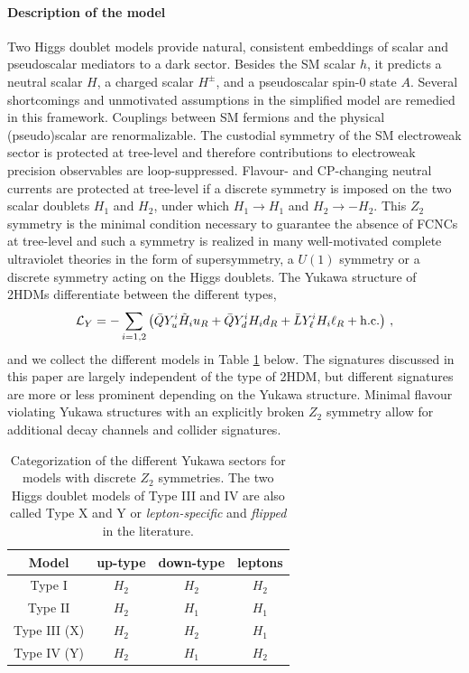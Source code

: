 




\paragraph{Description of the model}
Two Higgs doublet models provide natural, consistent embeddings of scalar and pseudoscalar mediators to a dark sector. Besides the SM scalar $h$, it predicts a neutral scalar $H$, a charged scalar $H^\pm$, and a pseudoscalar spin-0 state $A$. Several shortcomings and unmotivated assumptions in the simplified model are remedied in this framework. Couplings between SM fermions and the physical (pseudo)scalar are renormalizable. The custodial symmetry of the SM electroweak sector is protected at tree-level and therefore contributions to electroweak precision observables are loop-suppressed. Flavour- and CP-changing neutral currents are protected at tree-level if a discrete symmetry is imposed on the two scalar doublets $H_1$ and $H_2$, under which $H_1\to H_1$ and $H_2\to -H_2$. This $Z_2$ symmetry is the minimal condition necessary to guarantee the absence of FCNCs at tree-level \cite{Glashow:1976nt,Paschos:1976ay} and such a symmetry is realized in many well-motivated complete ultraviolet theories in the form of supersymmetry, a $U(1)$ symmetry or a discrete symmetry acting on the Higgs doublets. The Yukawa structure of 2HDMs differentiate between the different types, 
\begin{equation} \label{eq:LY}
{\cal L}_{Y} = - \sum_{i=1,2} \left ( \bar Q Y_u^i \tilde H_i u_R  + \bar Q Y_d^i H_i d_R   + \bar L Y_\ell^i H_i \ell_R  + {\rm h.c.}  \right ) \,,
\end{equation}
and we collect the different models in Table \ref{tab:coeffs} below. The signatures discussed in this paper are largely independent of the type of 2HDM, but different signatures are more or less prominent depending on the Yukawa structure. Minimal flavour violating Yukawa structures with an explicitly broken $Z_2$ symmetry allow for additional decay channels and collider signatures. 
%
\begin{table}[b]\centering
\begin{tabular}{|c|c|c|c|}
\hline
Model & up-type & down-type & leptons
\\ \hline
Type I & $H_2$ & $H_2$ & $H_2$
\\
Type II & $H_2$ & $H_1$ & $H_1$
\\
Type III (X) & $H_2$ & $H_2$ & $H_1$
\\
Type IV (Y) & $H_2$ & $H_1$ & $H_2$
\\ \hline
\end{tabular}
\caption{Categorization of the different Yukawa sectors for models with discrete ${Z}_2$
  symmetries. The two Higgs doublet models of Type III and IV are also called Type X and Y or \emph{lepton-specific} and \emph{flipped} in the literature. }\label{tab:coeffs}
\end{table}
